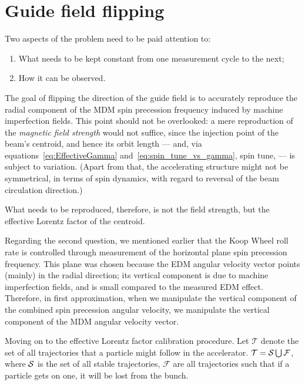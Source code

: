 \documentclass[]{elsarticle}
\newcommand{\w}{\omega}
\newcommand{\D}{\Delta}
\begin{document}
\section{Guide field flipping}
\newcommand{\Traj}{\mathcal T}
\DeclareDocumentCommand{\Stab}{s}{\mathcal{S}\IfBooleanT{#1}{\vert_{\w_y=0}}}
\newcommand{\Fail}{\mathcal F}
\renewcommand{\D}{\mathcal D}

Two aspects of the problem need to be paid attention to:
\begin{enumerate}
\item What needs to be kept constant from one measurement cycle to the next;
\item How it can be observed.
\end{enumerate}

The goal of flipping the direction of the guide field is to accurately reproduce the radial component
of the MDM spin precession frequency induced by machine imperfection fields. This point should not be overlooked:
a mere reproduction of the \emph{magnetic field strength} would not suffice, since the injection point of the beam's centroid,
and hence its orbit length --- and, via equations~\eqref{eq:EffectiveGamma} and~\eqref{eq:spin_tune_vs_gamma}, spin tune, --- is subject to variation. (Apart from that, the accelerating structure might not be symmetrical, in terms of spin dynamics, with regard to reversal of the beam circulation direction.)

What needs to be reproduced, therefore, is not the field strength, but the effective Lorentz factor of the centroid.

Regarding the second question, we mentioned earlier that the Koop Wheel roll rate
is controlled through measurement of the horizontal plane spin precession frequency. 
This plane was chosen because the EDM angular velocity vector points
(mainly) in the radial direction; its vertical component is due to machine imperfection fields, and is small compared to
the measured EDM effect. Therefore, in first approximation, when we manipulate the vertical component of the 
combined spin precession angular velocity, we manipulate the vertical component of the MDM angular velocity vector.

Moving on to the effective Lorentz factor calibration procedure.
Let $\Traj$ denote the set of all trajectories that a particle might follow in the accelerator.
$\Traj = \Stab \bigcup \Fail$, where $\Stab$ is the set of all stable trajectories, $\Fail$ are all trajectories
such that if a particle gets on one, it will be lost from the bunch.
\end{document}
